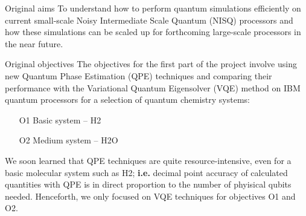 %
\begin{frame}{Original aims}
    To understand how to perform quantum simulations efficiently on current small-scale {\color{red}Noisy Intermediate Scale Quantum (NISQ)} processors and how these simulations
    can be scaled up for forthcoming large-scale processors in the near future.
\end{frame}

\begin{frame}{Original objectives}
    The objectives for the first part of the project involve using new {\color{red} Quantum Phase Estimation (QPE)} techniques and comparing their performance
    with the {\color{red}Variational Quantum Eigensolver (VQE)} method on IBM quantum processors for a selection of quantum chemistry systems:

    \vspace{2ex}

    \begin{enumerate}
      \setlength\itemsep{0.1em}
      \item[O1] Basic system – H2
      \item[O2] Medium system – H2O
    \end{enumerate}

    \vspace{2ex}

    We soon learned that QPE techniques are quite resource-intensive, even for a basic molecular system such as H2; \textbf{i.e.}
    decimal point accuracy of calculated quantities with QPE is in direct proportion to the number of phyisical qubits needed. Henceforth,
    we only focused on VQE techniques for objectives O1 and O2.
\end{frame}


